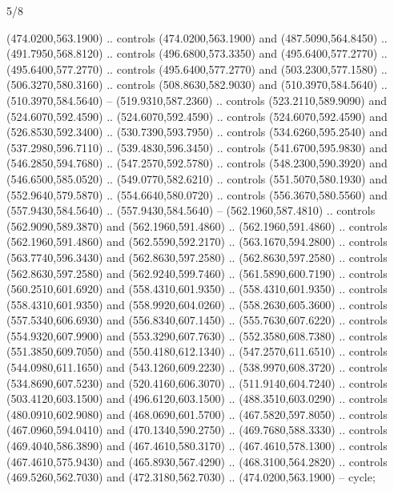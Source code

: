 \begin{flagdescription}{5/8}
\begin{scope}[shift={(m)}]
\begin{scope}[scale=\flagwidth/220,y=0.1mm, x=0.1mm, yscale=-1,shift={(-596,-360)}]
\begin{scope}[cm={{-1.0,0.0,0.0,1.0,(1193.9797,0.0)}}]
\begin{scope}[draw=black,line join=round,line cap=round,line width=0.381\lw]
\begin{scope}[fill=white,line width=1.143\lw]
 (474.0200,563.1900) .. controls (474.0200,563.1900) and
  (487.5090,564.8450) .. (491.7950,568.8120) .. controls (496.6800,573.3350) and
  (495.6400,577.2770) .. (495.6400,577.2770) .. controls (495.6400,577.2770) and
  (503.2300,577.1580) .. (506.3270,580.3160) .. controls (508.8630,582.9030) and
  (510.3970,584.5640) .. (510.3970,584.5640) -- (519.9310,587.2360) .. controls
  (523.2110,589.9090) and (524.6070,592.4590) .. (524.6070,592.4590) .. controls
  (524.6070,592.4590) and (526.8530,592.3400) .. (530.7390,593.7950) .. controls
  (534.6260,595.2540) and (537.2980,596.7110) .. (539.4830,596.3450) .. controls
  (541.6700,595.9830) and (546.2850,594.7680) .. (547.2570,592.5780) .. controls
  (548.2300,590.3920) and (546.6500,585.0520) .. (549.0770,582.6210) .. controls
  (551.5070,580.1930) and (552.9640,579.5870) .. (554.6640,580.0720) .. controls
  (556.3670,580.5560) and (557.9430,584.5640) .. (557.9430,584.5640) --
  (562.1960,587.4810) .. controls (562.9090,589.3870) and (562.1960,591.4860) ..
  (562.1960,591.4860) .. controls (562.1960,591.4860) and (562.5590,592.2170) ..
  (563.1670,594.2800) .. controls (563.7740,596.3430) and (562.8630,597.2580) ..
  (562.8630,597.2580) .. controls (562.8630,597.2580) and (562.9240,599.7460) ..
  (561.5890,600.7190) .. controls (560.2510,601.6920) and (558.4310,601.9350) ..
  (558.4310,601.9350) .. controls (558.4310,601.9350) and (558.9920,604.0260) ..
  (558.2630,605.3600) .. controls (557.5340,606.6930) and (556.8340,607.1450) ..
  (555.7630,607.6220) .. controls (554.9320,607.9900) and (553.3290,607.7630) ..
  (552.3580,608.7380) .. controls (551.3850,609.7050) and (550.4180,612.1340) ..
  (547.2570,611.6510) .. controls (544.0980,611.1650) and (543.1260,609.2230) ..
  (538.9970,608.3720) .. controls (534.8690,607.5230) and (520.4160,606.3070) ..
  (511.9140,604.7240) .. controls (503.4120,603.1500) and (496.6120,603.1500) ..
  (488.3510,603.0290) .. controls (480.0910,602.9080) and (468.0690,601.5700) ..
  (467.5820,597.8050) .. controls (467.0960,594.0410) and (470.1340,590.2750) ..
  (469.7680,588.3330) .. controls (469.4040,586.3890) and (467.4610,580.3170) ..
  (467.4610,578.1300) .. controls (467.4610,575.9430) and (465.8930,567.4290) ..
  (468.3100,564.2820) .. controls (469.5260,562.7030) and (472.3180,562.7030) ..
  (474.0200,563.1900) -- cycle;


\end{scope}
\end{scope}
\end{scope}
\end{scope}
\end{scope}
\end{flagdescription}
